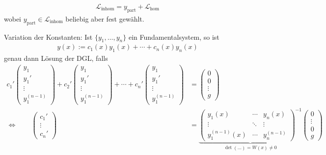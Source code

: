 \begin{theorem}
\begin{enum-arab}
			\begin{enum-alph}
				\item
					\begin{align*}
						\mathcal L_{\text{inhom}} = y_{\text{part}} + \mathcal L_{\text{hom}}
					\end{align*}
					wobei $y_{\text{part}} \in \mathcal L_{\text{inhom}}$ beliebig aber fest gewählt.
				\item
					Variation der Konstanten: Ist $\{y_1, \dotsc, y_n\}$ ein Fundamentalsystem, so ist
					\begin{align*}
						y(x) := c_1(x) y_1(x) + \dotsb + c_n(x)y_n(x)
					\end{align*}
					genau dann Lösung der DGL, falls
					\begin{align*}
						c_1' \begin{pmatrix}
							y_1 \\ y_1' \\ \vdots \\ y_1^{(n-1)}
						\end{pmatrix} +
						c_2' \begin{pmatrix}
							y_1 \\ y_1' \\ \vdots \\ y_1^{(n-1)}
						\end{pmatrix} + \dotsb +
						c_n' \begin{pmatrix}
							y_1 \\ y_1' \\ \vdots \\ y_1^{(n-1)}
						\end{pmatrix} &= \begin{pmatrix}
							0 \\ 0 \\ \vdots \\ g
						\end{pmatrix} \\
						\iff \qquad
						\begin{pmatrix}
							c_1' \\ \vdots \\ c_n'
						\end{pmatrix} &=
						\underbrace{\begin{pmatrix}
							y_1(x) & \cdots & y_n(x) \\
							\vdots & \ddots & \vdots \\
							y_1^{(n-1)}(x) & \cdots & y_n^{(n-1)}
						\end{pmatrix}^{-1}}_{\det(\dotso) = W(x) \neq 0} \begin{pmatrix}
							0 \\ \vdots \\ 0 \\ g
						\end{pmatrix}
					\end{align*}
			\end{enum-alph}
	\end{enum-arab}
\end{theorem}

